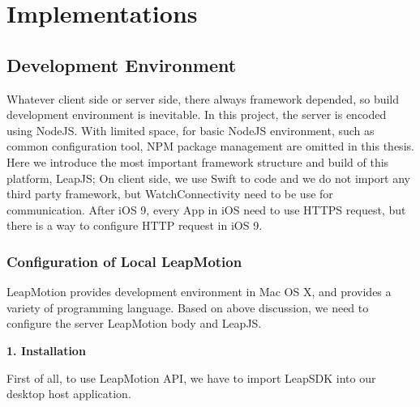 \chapter{Implementations}

\section{Development Environment}

Whatever client side or server side, there always framework depended, so build development environment is inevitable. In this project, the server is encoded using NodeJS. With limited space, for basic NodeJS environment, such as common configuration tool, NPM package management are omitted in this thesis. Here we introduce the most important framework structure and build of this platform, LeapJS; On client side, we use Swift to code and we do not import any third party framework, but WatchConnectivity need to be use for communication\cite{WatchConnectivity:2016}.
After iOS 9, every App in iOS need to use HTTPS request, but there is a way to configure HTTP request in iOS 9.

\subsection{Configuration of Local LeapMotion}

LeapMotion provides development environment in Mac OS X, and provides a variety of programming language. Based on above discussion, we need to configure the server LeapMotion body and LeapJS.

\textbf{1. Installation}

First of all, to use LeapMotion API, we have to import LeapSDK into our desktop host application.

